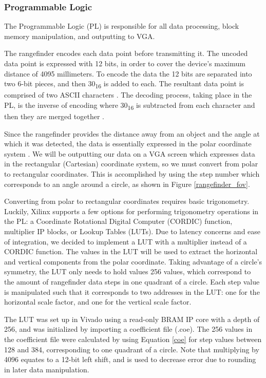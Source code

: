 \subsubsection{Programmable Logic}
The Programmable Logic (PL) is responsible for all data processing, block memory manipulation, and outputting to VGA.
\par
The rangefinder encodes each data point before transmitting it. The uncoded data point is expressed with 12 bits, in order to cover the device's maximum distance of 4095 millimeters. To encode the data the 12 bits are separated into two 6-bit pieces, and then 30\textsubscript{16} is added to each. The resultant data point is comprised of two ASCII characters \cite{ascii}. The decoding process, taking place in the PL, is the inverse of encoding where 30\textsubscript{16} is subtracted from each character and then they are merged together \cite{urg04lx_datasheet}.
\par
Since the rangefinder provides the distance away from an object and the angle at which it was detected, the data is essentially expressed in the polar coordinate system \cite{polar_coordinates}. We will be outputting our data on a VGA screen which expresses data in the rectangular (Cartesian) coordinate system, so we must convert from polar to rectangular coordinates. This is accomplished by using the step number which corresponds to an angle around a circle, as shown in Figure \ref{rangefinder_fov}.
\par
Converting from polar to rectangular coordinates requires basic trigonometry. Luckily, Xilinx supports a few options for performing trigonometry operations in the PL: a Coordinate Rotational Digital Computer (CORDIC) function, multiplier IP blocks, or Lookup Tables (LUTs). Due to latency concerns and ease of integration, we decided to implement a LUT with a multiplier instead of a CORDIC function. The values in the LUT will be used to extract the horizontal and vertical components from the polar coordinate. Taking advantage of a circle's symmetry, the LUT only needs to hold values 256 values, which correspond to the amount of rangefinder data steps in one quadrant of a circle. Each step value is manipulated such that it corresponds to two addresses in the LUT: one for the horizontal scale factor, and one for the vertical scale factor.
\par
The LUT was set up in Vivado using a read-only BRAM IP core with a depth of 256, and was initialized by importing a coefficient file (.coe). The 256 values in the coefficient file were calculated by using Equation \ref{coe} for step values between 128 and 384, corresponding to one quadrant of a circle. Note that multiplying by 4096 equates to a 12-bit left shift, and is used to decrease error due to rounding in later data manipulation.

